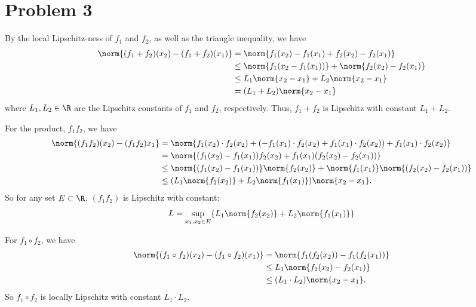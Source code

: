 \documentclass{homework}
\begin{document}
\section{Problem 3}
\begin{letterenum}
\item By the local Lipschitz-ness of $f_1$ and $f_2$, as well as the triangle
inequality, we have
\begin{align*}
    \norm{(f_1 + f_2)(x_2) - (f_1 + f_2)(x_1)} &=
        \norm{f_1(x_2) - f_1(x_1) + f_2(x_2) - f_2(x_1)} \\
        &\leq \norm{f_1(x_2 - f_1(x_1))} + \norm{f_2(x_2) - f_2(x_1)} \\
        &\leq L_1 \norm{x_2 - x_1} + L_2 \norm{x_2 - x_1} \\
        &= (L_1 + L_2) \norm{x_2 - x_1}
\end{align*}
where $L_1, L_2\in\R$ are the Lipschitz constants of $f_1$ and $f_2$, respectively.
Thus, $f_1 + f_2$ is Lipschitz with constant $L_1 + L_2$.

\item For the product, $f_1 f_2$, we have
\begin{align*}
    \norm{(f_1 f_2)(x_2) - (f_1 f_2) x_1} &=
        \norm{f_1(x_2) \cdot f_2(x_2) +
            (-f_1(x_1) \cdot f_2(x_2) + f_1(x_1) \cdot f_2(x_2)) + f_1(x_1) \cdot f_2(x_2)} \\
        &= \norm{
            (f_1(x_2) - f_1(x_1) ) f_2(x_2) + f_1(x_1) (f_2(x_2) - f_2(x_1))
        } \\
        &\leq \norm{
            (f_1(x_2) - f_1(x_1) )}\norm{ f_2(x_2) 
        } + \norm{
            f_1(x_1) }\norm{(f_2(x_2) - f_2(x_1))
        } \\
        &\leq (L_1 \norm{f_2(x_2)} + L_2 \norm{f_1(x_1)}) \norm{x_2 - x_1}.
\end{align*}
So for any set $E \subset \R$, $(f_1 f_2)$ is Lipschitz with constant:
\begin{equation*}
    L = \sup_{x_1,x_2\in E} \{L_1 \norm{f_2(x_2)} + L_2 \norm{f_1(x_1)}\}
\end{equation*}

\item For $f_1 \circ f_2$, we have
\begin{align*}
    \norm{(f_1\circ f_2)(x_2) - (f_1 \circ f_2) (x_1)}
        &= \norm{f_1(f_2(x_2)) - f_1(f_2(x_1))} \\
        &\leq L_1 \norm{f_2(x_2) - f_2(x_1)} \\
        &\leq (L_1 \cdot L_2) \norm{x_2 - x_1}.
\end{align*}
So $f_1 \circ f_2$ is locally Lipschitz with constant $L_1 \cdot L_2$.
\end{letterenum}
\end{document}
